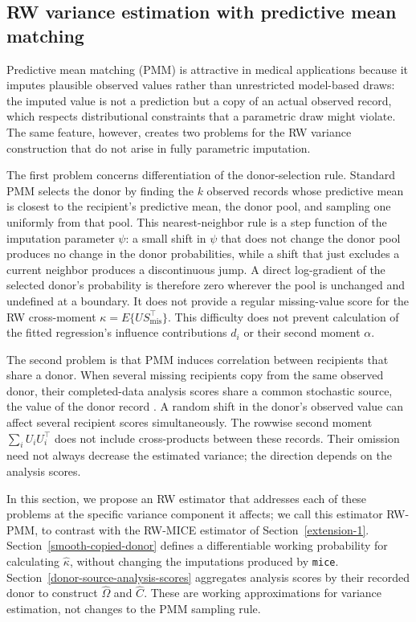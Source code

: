 \subsection{RW variance estimation with predictive mean matching}
\label{extension-2}
Predictive mean matching (PMM) is attractive in medical applications
because it imputes plausible observed values rather than unrestricted
model-based draws: the imputed value is not a prediction but a copy of an
actual observed record, which respects distributional constraints that a
parametric draw might violate.  The same feature, however, creates two
problems for the RW variance construction that do not arise in fully
parametric imputation.

The first problem concerns differentiation of the donor-selection rule.
Standard PMM selects
the donor by finding the \(k\) observed records whose predictive mean is
closest to the recipient's predictive mean, the donor pool, and sampling
one uniformly from that pool. This nearest-neighbor rule is a step
function of the imputation parameter \(\psi\): a small shift in \(\psi\)
that does not change the donor pool produces no change in the donor
probabilities, while a shift that just excludes a current neighbor
produces a discontinuous jump. A direct log-gradient of the selected
donor's probability is therefore zero wherever the pool is unchanged
and undefined at a boundary. It does not provide a regular missing-value
score for the RW cross-moment \(\kappa=E\{US_{\mathrm{mis}}^\top\}\).
This difficulty does not prevent calculation of the fitted regression's
influence contributions \(d_i\) or their second moment \(\alpha\).

The second problem is that PMM induces correlation between recipients
that share a donor.  When several missing recipients copy from the same
observed donor, their completed-data analysis scores share a common
stochastic source, the value of the donor record
\citep{rao1992jackknife, chen2002common}.
A random shift in the donor's observed value can affect several
recipient scores simultaneously. The rowwise second moment
\(\sum_i U_i U_i^\top\) does not include cross-products between these
records. Their omission need not always decrease the estimated variance;
the direction depends on the analysis scores.

In this section, we propose an RW estimator that addresses each of
these problems at the specific variance component it affects; we call
this estimator RW-PMM, to contrast with the RW-MICE estimator of
Section~\ref{extension-1}.  Section~\ref{smooth-copied-donor}
defines a differentiable working probability for calculating
\(\widehat\kappa\), without changing the imputations produced by
\texttt{mice}. Section~\ref{donor-source-analysis-scores} aggregates
analysis scores by their recorded donor to construct
\(\widehat\Omega\) and \(\widehat C\). These are working approximations
for variance estimation, not changes to the PMM sampling rule.
